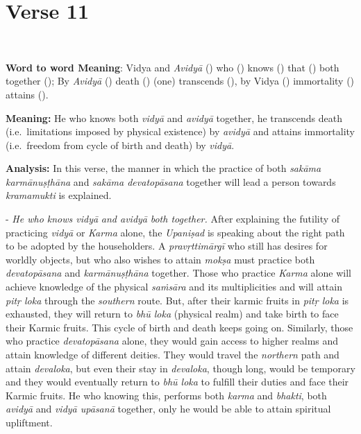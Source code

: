 \chapter{Verse 11}

\begin{moolashloka}
\\
\end{moolashloka}
\vskip 1pt

\textbf{Word to word Meaning}: Vidya and \emph{Avidyā} () who () knows () that () both together (); By \emph{Avidyā} () death () (one) transcends (), by Vidya () immortality () attains ().
\vskip 1.1pt

\textbf{Meaning:} He who knows both \emph{vidyā} and \emph{avidyā} together, he transcends death (i.e.\ limitations imposed by physical existence) by \emph{avidyā} and attains immortality (i.e.\ freedom from cycle of birth and death) by \emph{vidyā}.
\vskip 1.1pt

\textbf{Analysis:} In this verse, the manner in which the practice of both \emph{sakāma karmānuṣṭhāna} and \emph{sakāma devatopāsana} together will lead a person towards \emph{kramamukti} is explained.
\vskip 1.1pt

- \emph{He who knows vidyā} \emph{and avidyā} \emph{both together.} After explaining the futility of practicing \emph{vidyā} or \emph{Karma} alone, the \emph{Upaniṣad} is speaking about the right path to be adopted by the householders. A \emph{pravṛttimārgī} who still has desires for worldly objects, but who also wishes to attain \emph{mokṣa} must practice both \emph{devatopāsana} and \emph{karmānuṣṭhāna} together. Those who practice \emph{Karma} alone will achieve knowledge of the physical \emph{saṁsāra} and its multiplicities and will attain \emph{pitṛ loka} through the \emph{southern} route. But, after their karmic fruits in \emph{pitṛ loka} is exhausted, they will return to \emph{bhū loka} (physical realm) and take birth to face their Karmic fruits. This cycle of birth and death keeps going on. Similarly, those who practice \emph{devatopāsana} alone, they would gain access to higher realms and attain knowledge of different deities. They would travel the \emph{northern} path and attain \emph{devaloka}, but even their stay in \emph{devaloka}, though long, would be temporary and they would eventually return to \emph{bhū loka} to fulfill their duties and face their Karmic fruits. He who knowing this, performs both \emph{karma} and \emph{bhakti}, both \emph{avidyā} and \emph{vidyā upāsanā} together, only he would be able to attain spiritual upliftment.

